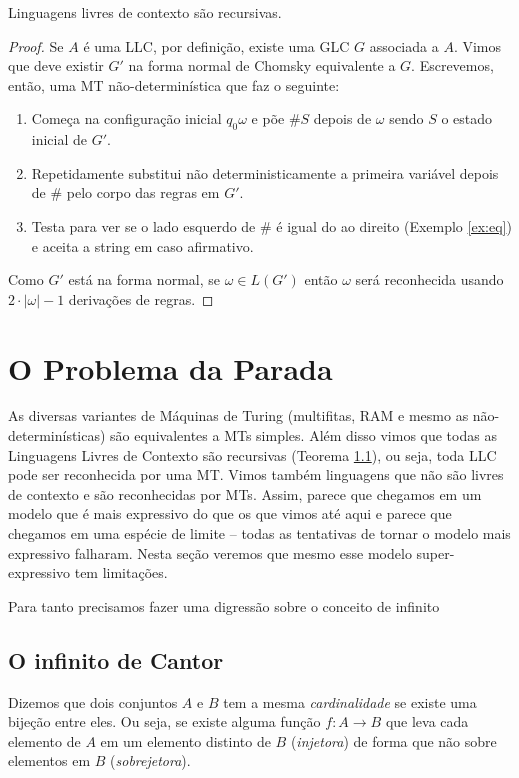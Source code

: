 \begin{theorem}
  Linguagens livres de contexto são recursivas.
\end{theorem}
\begin{proof}
  Se $A$ é uma LLC, por definição, existe uma GLC $G$ associada a $A$.
  Vimos que deve existir $G'$ na forma normal de Chomsky equivalente a $G$.
  Escrevemos, então, uma MT não-determinística que faz o seguinte:
  \begin{enumerate}
    \item Começa na configuração inicial $q_0\omega$ e põe $\#S$ depois de $\omega$ sendo $S$ o estado inicial de $G'$.
    \item Repetidamente substitui não deterministicamente a primeira variável depois de $\#$ pelo corpo das regras em $G'$.
    \item Testa para ver se o lado esquerdo de $\#$ é igual do ao direito (Exemplo \ref{ex:eq}) e aceita a string em caso afirmativo.
    \end{enumerate}
  Como $G'$ está na forma normal, se $\omega \in L(G')$ então $\omega$ será reconhecida usando $2\cdot|\omega| - 1$ derivações de regras.
\end{proof}

\section{O Problema da Parada}
\label{sec:problema-parada}

As diversas variantes de Máquinas de Turing (multifitas, RAM e mesmo as não-determinísticas) são equivalentes a MTs simples.
Além disso vimos que todas as Linguagens Livres de Contexto são recursivas (Teorema \ref{}), ou seja, toda LLC pode ser reconhecida por uma MT.
Vimos também linguagens que não são livres de contexto e são reconhecidas por MTs.
Assim, parece que chegamos em um modelo que é mais expressivo do que os que vimos até aqui e parece que chegamos em uma espécie de limite -- todas as tentativas de tornar o modelo mais expressivo falharam.
Nesta seção veremos que mesmo esse modelo super-expressivo tem limitações.

Para tanto precisamos fazer uma digressão sobre o conceito de infinito

\subsection{O infinito de Cantor}

Dizemos que dois conjuntos $A$ e $B$ tem a mesma {\em cardinalidade} se existe uma bijeção entre eles.
Ou seja, se existe alguma função $f: A \to B$ que leva cada elemento de $A$ em um elemento distinto de $B$ ({\em injetora}) de forma que não sobre elementos em $B$ ({\em sobrejetora}).

